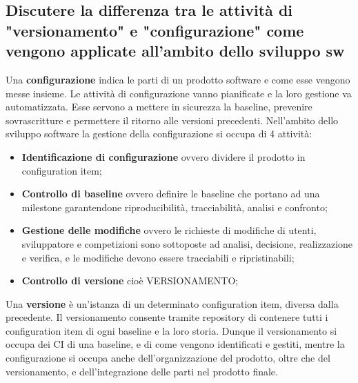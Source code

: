 \subsection{Discutere la differenza tra le attività di "versionamento" e "configurazione" come vengono applicate all'ambito dello sviluppo sw}
Una \textbf{configurazione} indica le parti di un prodotto software e come esse vengono messe insieme. Le attività di configurazione vanno pianificate e la loro gestione va automatizzata. Esse servono a mettere in sicurezza la baseline, prevenire sovrascritture e permettere il ritorno alle versioni precedenti.
Nell'ambito dello sviluppo software la gestione della configurazione si occupa di 4 attività:
\begin{itemize}
	\item \textbf{Identificazione di configurazione} ovvero dividere il prodotto in configuration item;
	\item \textbf{Controllo di baseline} ovvero definire le baseline che portano ad una milestone garantendone riproducibilità, tracciabilità, analisi e confronto;
	\item \textbf{Gestione delle modifiche} ovvero le richieste di modifiche di utenti, sviluppatore e competizioni sono sottoposte ad analisi, decisione, realizzazione e verifica, e le modifiche devono essere tracciabili e ripristinabili;
\item \textbf{Controllo di versione} cioè VERSIONAMENTO;
	\end{itemize}
Una \textbf{versione} è un'istanza di un determinato configuration item, diversa dalla precedente. Il versionamento consente tramite repository di contenere tutti i configuration item di ogni baseline e la loro storia.
Dunque il versionamento si occupa dei CI di una baseline, e di come vengono identificati e gestiti, mentre la configurazione si occupa anche dell'organizzazione del prodotto, oltre che del versionamento, e dell'integrazione delle parti nel prodotto finale.